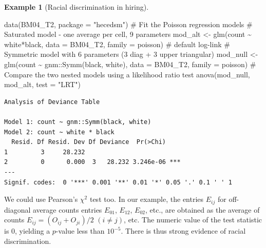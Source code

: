 \documentclass[
  11pt,
  letterpaper,
]{scrbook}
\newenvironment{Shaded}{\begin{snugshade}}{\end{snugshade}}
\newcommand{\AttributeTok}[1]{\textcolor[rgb]{0.40,0.45,0.13}{#1}}
\newcommand{\CommentTok}[1]{\textcolor[rgb]{0.37,0.37,0.37}{#1}}
\newcommand{\ConstantTok}[1]{\textcolor[rgb]{0.56,0.35,0.01}{#1}}
\newcommand{\FunctionTok}[1]{\textcolor[rgb]{0.28,0.35,0.67}{#1}}
\newcommand{\NormalTok}[1]{\textcolor[rgb]{0.00,0.23,0.31}{#1}}
\newcommand{\OtherTok}[1]{\textcolor[rgb]{0.00,0.23,0.31}{#1}}
\newcommand{\SpecialCharTok}[1]{\textcolor[rgb]{0.37,0.37,0.37}{#1}}
\newcommand{\StringTok}[1]{\textcolor[rgb]{0.13,0.47,0.30}{#1}}
\theoremstyle{definition}
\newtheorem{example}{Example}[chapter]
\theoremstyle{definition}
\theoremstyle{remark}
\begin{document}
\begin{example}[Racial discrimination in
hiring]
\begin{Shaded}
\begin{Highlighting}[]
\FunctionTok{data}\NormalTok{(BM04\_T2, }\AttributeTok{package =} \StringTok{"hecedsm"}\NormalTok{)}
\CommentTok{\# Fit the Poisson regression models}
\CommentTok{\# Saturated model {-} one average per cell, 9 parameters }
\NormalTok{mod\_alt }\OtherTok{\textless{}{-}} \FunctionTok{glm}\NormalTok{(count }\SpecialCharTok{\textasciitilde{}}\NormalTok{ white}\SpecialCharTok{*}\NormalTok{black, }
             \AttributeTok{data =}\NormalTok{ BM04\_T2, }
             \AttributeTok{family =}\NormalTok{ poisson) }\CommentTok{\# default log{-}link}
\CommentTok{\# Symmetric model with 6 parameters (3 diag + 3 upper triangular)}
\NormalTok{mod\_null }\OtherTok{\textless{}{-}} \FunctionTok{glm}\NormalTok{(count }\SpecialCharTok{\textasciitilde{}}\NormalTok{ gnm}\SpecialCharTok{::}\FunctionTok{Symm}\NormalTok{(black, white), }
                \AttributeTok{data =}\NormalTok{ BM04\_T2, }
                \AttributeTok{family =}\NormalTok{ poisson)}
\CommentTok{\# Compare the two nested models using a likelihood ratio test}
\FunctionTok{anova}\NormalTok{(mod\_null, mod\_alt,  }\AttributeTok{test =} \StringTok{"LRT"}\NormalTok{)}
\end{Highlighting}
\end{Shaded}

\begin{verbatim}
Analysis of Deviance Table

Model 1: count ~ gnm::Symm(black, white)
Model 2: count ~ white * black
  Resid. Df Resid. Dev Df Deviance  Pr(>Chi)    
1         3     28.232                          
2         0      0.000  3   28.232 3.246e-06 ***
---
Signif. codes:  0 '***' 0.001 '**' 0.01 '*' 0.05 '.' 0.1 ' ' 1
\end{verbatim}

\begin{Shaded}
\end{Shaded}

We could use Pearson's \(\chi^2\) test too. In our example, the entries
\(E_{ij}\) for off-diagonal average counts entries \(E_{01}\),
\(E_{12}\), \(E_{02}\), etc., are obtained as the average of counts
\(E_{ij} = (O_{ij} + O_{ji})/2\) \((i\neq j)\), etc. The numeric value
of the test statistic is 0, yielding a \(p\)-value less than
\(10^{-5}\). There is thus strong evidence of racial discrimination.


\end{example}
\end{document}
